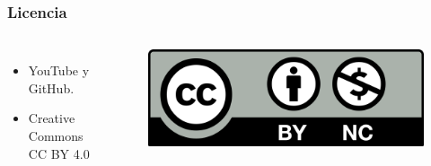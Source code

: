 \documentclass{beamer}
\begin{document}
\begin{frame}
  \frametitle{Licencia}
  \begin{columns}
    \begin{itemize}
      \item YouTube y GitHub.
      \item Creative Commons CC BY 4.0
    \end{itemize}

    \begin{figure}
      \centering
      \includegraphics[width=\textwidth]{img/CC.png}
    \end{figure}
  \end{columns}

\end{frame}
\end{document}
